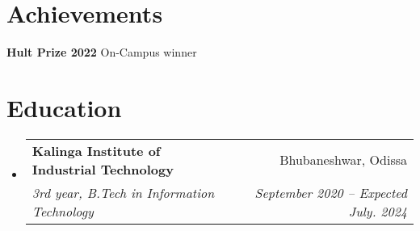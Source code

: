 \documentclass[letterpaper,11pt]{article}
\makeatletter
\newcommand{\resumeSubheading}[4]{
  \vspace{-2pt}\item
    \begin{tabular*}{0.97\textwidth}[t]{l@{\extracolsep{\fill}}r}
      \textbf{#1} & #2 \\
      \textit{\small#3} & \textit{\small #4} \\
    \end{tabular*}\vspace{-7pt}
}
\newcommand{\resumeSubHeadingListStart}{\begin{itemize}[leftmargin=0.15in, label={}]}
\newcommand{\resumeSubHeadingListEnd}{\end{itemize}}
\makeatother
\begin{document}

\section{Achievements}
\begin{itemize}[leftmargin=0.15in, label={}]
	\small{\item{
		\textbf{Hult Prize 2022}{ On-Campus winner } \\
	}}
\end{itemize}
 
\section{Education}
\resumeSubHeadingListStart
\resumeSubheading
{Kalinga Institute of Industrial Technology}{Bhubaneshwar, Odissa}
{3rd year, B.Tech in Information Technology}{September 2020 -- Expected July. 2024}
\resumeSubHeadingListEnd
\end{document}
